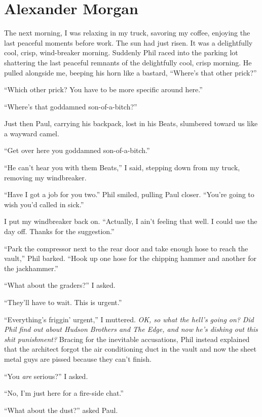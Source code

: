\chapter{Alexander Morgan}

\titlemark

The next morning, I was relaxing in my truck, savoring my coffee,
enjoying the last peaceful moments before work. The sun had just risen.
It was a delightfully cool, crisp, wind-breaker morning. Suddenly Phil
raced into the parking lot shattering the last peaceful remnants of the
delightfully cool, crisp morning. He pulled alongside me, beeping his
horn like a bastard, ``Where's that other prick?''

``Which other prick? You have to be more specific around here.''

``Where's that goddamned son-of-a-bitch?''

Just then Paul, carrying his backpack, lost in his Beats, slumbered
toward us like a wayward camel.

``Get over here you goddamned son-of-a-bitch.''

``He can't hear you with them Beats,'' I said, stepping down from my
truck, removing my windbreaker.

``Have I got a job for you two.'' Phil smiled, pulling Paul closer.
``You're going to wish you'd called in sick.''

I put my windbreaker back on. ``Actually, I ain't feeling that well. I
could use the day off. Thanks for the suggestion.''

``Park the compressor next to the rear door and take enough hose to
reach the vault,'' Phil barked. ``Hook up one hose for the chipping
hammer and another for the jackhammer.''

``What about the graders?'' I asked.

``They'll have to wait. This is urgent.''

``Everything's friggin' urgent,'' I muttered. \emph{OK, so what the
hell's going on?} \emph{Did Phil find out about Hudson Brothers and The
Edge, and now he's dishing out this shit punishment?} Bracing for the
inevitable accusations, Phil instead explained that the architect forgot
the air conditioning duct in the vault and now the sheet metal guys are
pissed because they can't finish.

``You \emph{are} serious?'' I asked.

``No, I'm just here for a fire-side chat.''

``What about the dust?'' asked Paul.

